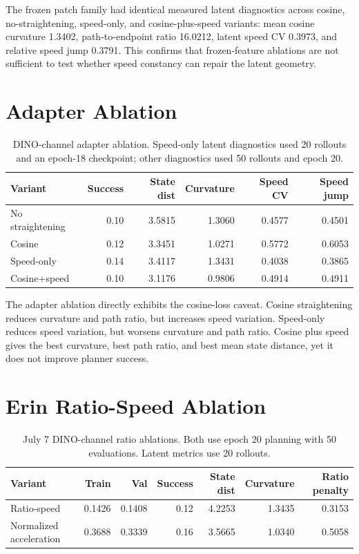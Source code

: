 \documentclass[11pt]{article}
\begin{document}
The frozen patch family had identical measured latent diagnostics across cosine, no-straightening, speed-only, and cosine-plus-speed variants: mean cosine curvature 1.3402, path-to-endpoint ratio 16.0212, latent speed CV 0.3973, and relative speed jump 0.3791. This confirms that frozen-feature ablations are not sufficient to test whether speed constancy can repair the latent geometry.

\section{Adapter Ablation}

\begin{table}[h]
\centering
\begin{tabular}{lrrrrr}
\toprule
Variant & Success & State dist & Curvature & Speed CV & Speed jump \\
\midrule
No straightening & 0.10 & 3.5815 & 1.3060 & 0.4577 & 0.4501 \\
Cosine & 0.12 & 3.3451 & 1.0271 & 0.5772 & 0.6053 \\
Speed-only & 0.14 & 3.4117 & 1.3431 & 0.4038 & 0.3865 \\
Cosine+speed & 0.10 & 3.1176 & 0.9806 & 0.4914 & 0.4911 \\
\bottomrule
\end{tabular}
\caption{DINO-channel adapter ablation. Speed-only latent diagnostics used 20 rollouts and an epoch-18 checkpoint; other diagnostics used 50 rollouts and epoch 20.}
\end{table}

The adapter ablation directly exhibits the cosine-loss caveat. Cosine straightening reduces curvature and path ratio, but increases speed variation. Speed-only reduces speed variation, but worsens curvature and path ratio. Cosine plus speed gives the best curvature, best path ratio, and best mean state distance, yet it does not improve planner success.

\section{Erin Ratio-Speed Ablation}

\begin{table}[h]
\centering
\small
\begin{tabular}{lrrrrrr}
\toprule
Variant & Train & Val & Success & State dist & Curvature & Ratio penalty \\
\midrule
Ratio-speed & 0.1426 & 0.1408 & 0.12 & 4.2253 & 1.3435 & 0.3153 \\
Normalized acceleration & 0.3688 & 0.3339 & 0.16 & 3.5665 & 1.0340 & 0.5058 \\
\bottomrule
\end{tabular}
\caption{July 7 DINO-channel ratio ablations. Both use epoch 20 planning with 50 evaluations. Latent metrics use 20 rollouts.}
\end{table}
\end{document}
